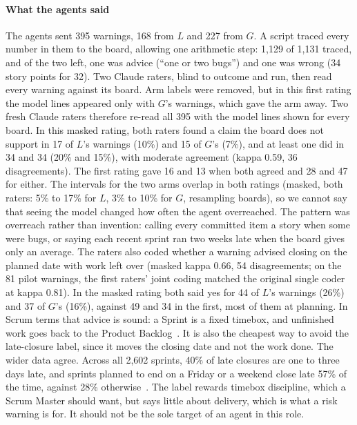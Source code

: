 \documentclass[conference]{IEEEtran}
\begin{document}
\paragraph{What the agents said} The agents sent 395 warnings, 168 from $L$ and 227 from $G$. A script traced every number in them to the board, allowing one arithmetic step: 1,129 of 1,131 traced, and of the two left, one was advice (``one or two bugs'') and one was wrong (34 story points for 32). Two Claude raters, blind to outcome and run, then read every warning against its board. Arm labels were removed, but in this first rating the model lines appeared only with $G$'s warnings, which gave the arm away. Two fresh Claude raters therefore re-read all 395 with the model lines shown for every board. In this masked rating, both raters found a claim the board does not support in 17 of $L$'s warnings (10\%) and 15 of $G$'s (7\%), and at least one did in 34 and 34 (20\% and 15\%), with moderate agreement (kappa 0.59, 36 disagreements). The first rating gave 16 and 13 when both agreed and 28 and 47 for either. The intervals for the two arms overlap in both ratings (masked, both raters: 5\% to 17\% for $L$, 3\% to 10\% for $G$, resampling boards), so we cannot say that seeing the model changed how often the agent overreached. The pattern was overreach rather than invention: calling every committed item a story when some were bugs, or saying each recent sprint ran two weeks late when the board gives only an average. The raters also coded whether a warning advised closing on the planned date with work left over (masked kappa 0.66, 54 disagreements; on the 81 pilot warnings, the first raters' joint coding matched the original single coder at kappa 0.81). In the masked rating both said yes for 44 of $L$'s warnings (26\%) and 37 of $G$'s (16\%), against 49 and 34 in the first, most of them at planning. In Scrum terms that advice is sound: a Sprint is a fixed timebox, and unfinished work goes back to the Product Backlog~\cite{scrumguide}. It is also the cheapest way to avoid the late-closure label, since it moves the closing date and not the work done. The wider data agree. Across all 2,602 sprints, 40\% of late closures are one to three days late, and sprints planned to end on a Friday or a weekend close late 57\% of the time, against 28\% otherwise~\cite{artifact}. The label rewards timebox discipline, which a Scrum Master should want, but says little about delivery, which is what a risk warning is for. It should not be the sole target of an agent in this role.
\end{document}
